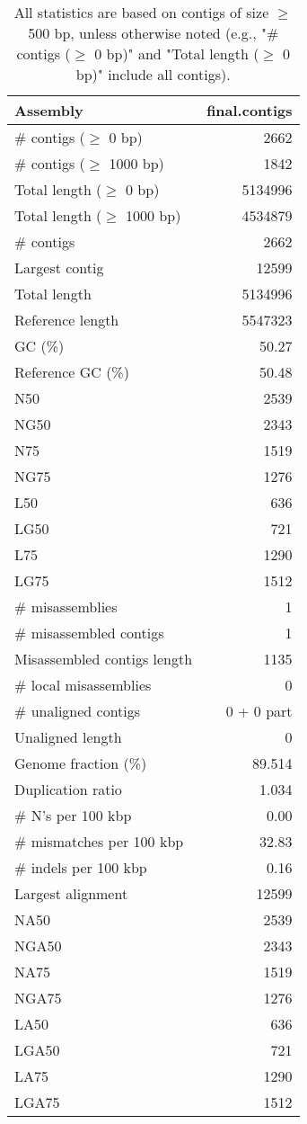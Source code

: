 \documentclass[12pt,a4paper]{article}
\begin{document}
\begin{table}[ht]
\begin{center}
\caption{All statistics are based on contigs of size $\geq$ 500 bp, unless otherwise noted (e.g., "\# contigs ($\geq$ 0 bp)" and "Total length ($\geq$ 0 bp)" include all contigs).}
\begin{tabular}{|l*{1}{|r}|}
\hline
Assembly & final.contigs \\ \hline
\# contigs ($\geq$ 0 bp) & 2662 \\ \hline
\# contigs ($\geq$ 1000 bp) & 1842 \\ \hline
Total length ($\geq$ 0 bp) & 5134996 \\ \hline
Total length ($\geq$ 1000 bp) & 4534879 \\ \hline
\# contigs & 2662 \\ \hline
Largest contig & 12599 \\ \hline
Total length & 5134996 \\ \hline
Reference length & 5547323 \\ \hline
GC (\%) & 50.27 \\ \hline
Reference GC (\%) & 50.48 \\ \hline
N50 & 2539 \\ \hline
NG50 & 2343 \\ \hline
N75 & 1519 \\ \hline
NG75 & 1276 \\ \hline
L50 & 636 \\ \hline
LG50 & 721 \\ \hline
L75 & 1290 \\ \hline
LG75 & 1512 \\ \hline
\# misassemblies & 1 \\ \hline
\# misassembled contigs & 1 \\ \hline
Misassembled contigs length & 1135 \\ \hline
\# local misassemblies & 0 \\ \hline
\# unaligned contigs & 0 + 0 part \\ \hline
Unaligned length & 0 \\ \hline
Genome fraction (\%) & 89.514 \\ \hline
Duplication ratio & 1.034 \\ \hline
\# N's per 100 kbp & 0.00 \\ \hline
\# mismatches per 100 kbp & 32.83 \\ \hline
\# indels per 100 kbp & 0.16 \\ \hline
Largest alignment & 12599 \\ \hline
NA50 & 2539 \\ \hline
NGA50 & 2343 \\ \hline
NA75 & 1519 \\ \hline
NGA75 & 1276 \\ \hline
LA50 & 636 \\ \hline
LGA50 & 721 \\ \hline
LA75 & 1290 \\ \hline
LGA75 & 1512 \\ \hline
\end{tabular}
\end{center}
\end{table}
\end{document}
